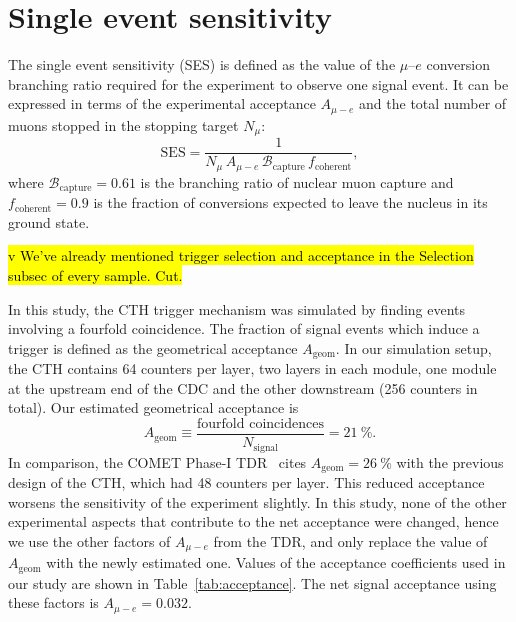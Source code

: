 \section{Single event sensitivity}
The single event sensitivity (SES) is defined as the value of the $\mu$--$e$
conversion branching ratio required for the experiment to observe one signal
event. It can be expressed in terms of the experimental acceptance $A_{\mu-e}$ and the
total number of muons stopped in the stopping target $N_\mu$:
\begin{equation}
    \mathrm{SES} = \frac{1}{N_\mu\,A_{\mu-e}\,\mathcal{B}_\mathrm{capture}\,f_\mathrm{coherent}},
\end{equation}
where $\mathcal{B}_\mathrm{capture} = 0.61$ is the branching ratio of nuclear
muon capture and $f_\mathrm{coherent} = 0.9$ is the fraction of conversions
expected to leave the nucleus in its ground state.



\hl{ v We've already mentioned trigger selection and acceptance in the Selection
    subsec of every sample. Cut.}
    
In this study, the CTH trigger mechanism was simulated by finding events
involving a fourfold coincidence. The fraction of signal events which induce a
trigger is defined as the geometrical acceptance $A_\mathrm{geom}$. In our
simulation setup, the CTH contains 64 counters per layer, two layers
in each module, one module at the upstream end of the CDC and the other
downstream (256 counters in total). Our estimated geometrical acceptance is
$$
A_\mathrm{geom} \equiv \frac{\text{fourfold coincidences}}{N_\mathrm{signal}} = \SI{21}{\percent}.
$$
In comparison, the COMET Phase-I TDR~\cite{the_comet_collaboration_comet_2020}
cites $A_\mathrm{geom} = \SI{26}{\percent}$ with the previous design of the CTH,
which had 48 counters per layer. This reduced acceptance worsens the sensitivity
of the experiment slightly. In this study, none of the other experimental
aspects that contribute to the net acceptance were changed, hence we use the
other factors of $A_{\mu-e}$ from the TDR, and only replace the value of
$A_\mathrm{geom}$ with the newly estimated one. Values of the acceptance
coefficients used in our study are shown in Table~\ref{tab:acceptance}. The net
signal acceptance using these factors is $A_{\mu-e} = 0.032$.

